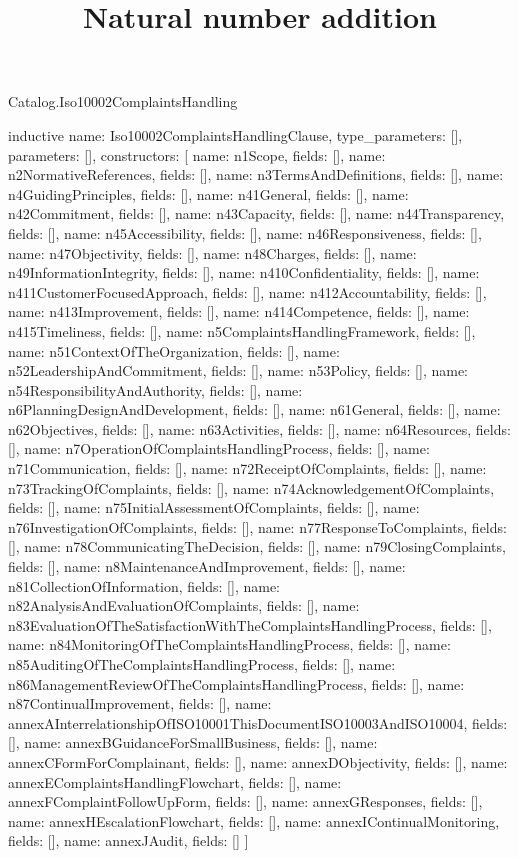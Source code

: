 \begin{lexlean}{Catalog.Iso10002ComplaintsHandling}
\title{Natural number addition}
\begin{semanticmodule}
inductive{
  name: Iso10002ComplaintsHandlingClause,
  type_parameters: [],
  parameters: [],
  constructors: [
    {name: n1Scope, fields: []},
    {name: n2NormativeReferences, fields: []},
    {name: n3TermsAndDefinitions, fields: []},
    {name: n4GuidingPrinciples, fields: []},
    {name: n41General, fields: []},
    {name: n42Commitment, fields: []},
    {name: n43Capacity, fields: []},
    {name: n44Transparency, fields: []},
    {name: n45Accessibility, fields: []},
    {name: n46Responsiveness, fields: []},
    {name: n47Objectivity, fields: []},
    {name: n48Charges, fields: []},
    {name: n49InformationIntegrity, fields: []},
    {name: n410Confidentiality, fields: []},
    {name: n411CustomerFocusedApproach, fields: []},
    {name: n412Accountability, fields: []},
    {name: n413Improvement, fields: []},
    {name: n414Competence, fields: []},
    {name: n415Timeliness, fields: []},
    {name: n5ComplaintsHandlingFramework, fields: []},
    {name: n51ContextOfTheOrganization, fields: []},
    {name: n52LeadershipAndCommitment, fields: []},
    {name: n53Policy, fields: []},
    {name: n54ResponsibilityAndAuthority, fields: []},
    {name: n6PlanningDesignAndDevelopment, fields: []},
    {name: n61General, fields: []},
    {name: n62Objectives, fields: []},
    {name: n63Activities, fields: []},
    {name: n64Resources, fields: []},
    {name: n7OperationOfComplaintsHandlingProcess, fields: []},
    {name: n71Communication, fields: []},
    {name: n72ReceiptOfComplaints, fields: []},
    {name: n73TrackingOfComplaints, fields: []},
    {name: n74AcknowledgementOfComplaints, fields: []},
    {name: n75InitialAssessmentOfComplaints, fields: []},
    {name: n76InvestigationOfComplaints, fields: []},
    {name: n77ResponseToComplaints, fields: []},
    {name: n78CommunicatingTheDecision, fields: []},
    {name: n79ClosingComplaints, fields: []},
    {name: n8MaintenanceAndImprovement, fields: []},
    {name: n81CollectionOfInformation, fields: []},
    {name: n82AnalysisAndEvaluationOfComplaints, fields: []},
    {name: n83EvaluationOfTheSatisfactionWithTheComplaintsHandlingProcess, fields: []},
    {name: n84MonitoringOfTheComplaintsHandlingProcess, fields: []},
    {name: n85AuditingOfTheComplaintsHandlingProcess, fields: []},
    {name: n86ManagementReviewOfTheComplaintsHandlingProcess, fields: []},
    {name: n87ContinualImprovement, fields: []},
    {name: annexAInterrelationshipOfISO10001ThisDocumentISO10003AndISO10004, fields: []},
    {name: annexBGuidanceForSmallBusiness, fields: []},
    {name: annexCFormForComplainant, fields: []},
    {name: annexDObjectivity, fields: []},
    {name: annexEComplaintsHandlingFlowchart, fields: []},
    {name: annexFComplaintFollowUpForm, fields: []},
    {name: annexGResponses, fields: []},
    {name: annexHEscalationFlowchart, fields: []},
    {name: annexIContinualMonitoring, fields: []},
    {name: annexJAudit, fields: []}
  ]
}


\end{semanticmodule}
\end{lexlean}
